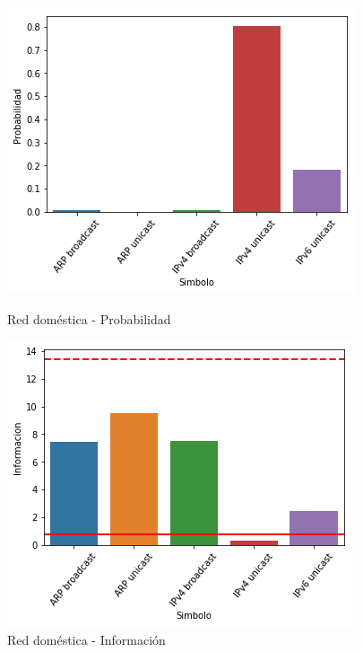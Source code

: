 \begin{figure}[H]
	\begin{minipage}{0.49\textwidth}
		\centering
		\includegraphics[width=\linewidth]{imagenes/manu_casa_barras_prob}
		\caption{Red doméstica - Probabilidad}
		\label{casa_barras_prob}
	\end{minipage}
	\begin{minipage}{0.49\textwidth}
		\centering
		\includegraphics[width=\linewidth]{imagenes/manu_casa_barras_info}
		\caption{Red doméstica - Información}
		\label{casa_barras_info}
	\end{minipage}
\end{figure}

